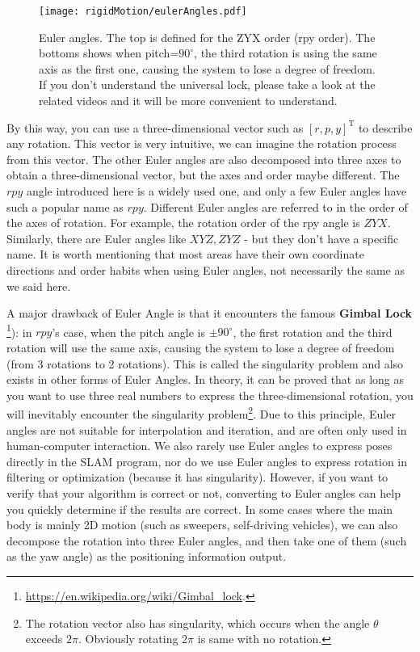 \begin{figure}[!t]
    \centering
    \texttt{[image: rigidMotion/eulerAngles.pdf]}
    \caption{Euler angles. The top is defined for the ZYX order (rpy order). The bottoms shows when pitch=$90^\circ$, the third rotation is using the same axis as the first one, causing the system to lose a degree of freedom. If you don't understand the universal lock, please take a look at the related videos and it will be more convenient to understand. }
    \label{fig:eulerAngles}
\end{figure}

By this way, you can use a three-dimensional vector such as $[r,p,y]^\mathrm{T}$ to describe any rotation. This vector is very intuitive, we can imagine the rotation process from this vector. The other Euler angles are also decomposed into three axes to obtain a three-dimensional vector, but the axes and order maybe different. The $rpy$ angle introduced here is a widely used one, and only a few Euler angles have such a popular name as $rpy$. Different Euler angles are referred to in the order of the axes of rotation. For example, the rotation order of the rpy angle is $ZYX$. Similarly, there are Euler angles like $XYZ, ZYZ$ - but they don't have a specific name. It is worth mentioning that most areas have their own coordinate directions and order habits when using Euler angles, not necessarily the same as we said here.

A major drawback of Euler Angle is that it encounters the famous \textbf{Gimbal Lock} \footnote{\url{https://en.wikipedia.org/wiki/Gimbal_lock}.}): in $rpy$'s case, when the pitch angle is $\pm 90 ^\circ $, the first rotation and the third rotation will use the same axis, causing the system to lose a degree of freedom (from 3 rotations to 2 rotations). This is called the singularity problem and also exists in other forms of Euler Angles. In theory, it can be proved that as long as you want to use three real numbers to express the three-dimensional rotation, you will inevitably encounter the singularity problem\footnote{The rotation vector also has singularity, which occurs when the angle $\theta$ exceeds $2\pi$. Obviously rotating $2\pi$ is same with no rotation.}. Due to this principle, Euler angles are not suitable for interpolation and iteration, and are often only used in human-computer interaction. We also rarely use Euler angles to express poses directly in the SLAM program, nor do we use Euler angles to express rotation in filtering or optimization (because it has singularity). However, if you want to verify that your algorithm is correct or not, converting to Euler angles can help you quickly determine if the results are correct. In some cases where the main body is mainly 2D motion (such as sweepers, self-driving vehicles), we can also decompose the rotation into three Euler angles, and then take one of them (such as the yaw angle) as the positioning information output.

